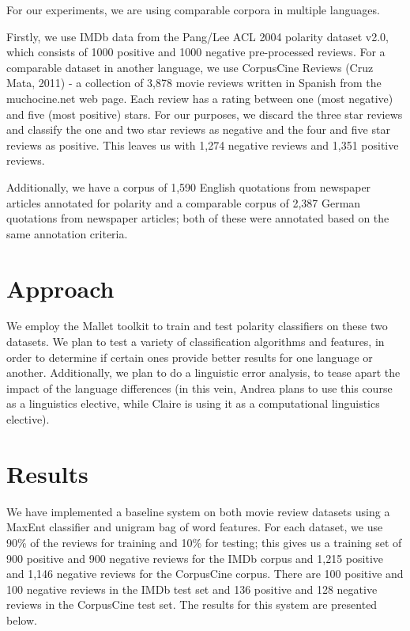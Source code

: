 \documentclass[11pt]{article}
\begin{document}
For our experiments, we are using comparable corpora in multiple languages.

Firstly, we use IMDb data from the Pang/Lee ACL 2004 polarity dataset v2.0, which consists of 1000 positive and 1000 negative pre-processed reviews.  For a comparable dataset in another language, we use CorpusCine Reviews (Cruz Mata, 2011) - a collection of 3,878 movie reviews written in Spanish from the muchocine.net web page.  Each review has a rating between one (most negative) and five (most positive) stars.  For our purposes, we discard the three star reviews and classify the one and two star reviews as negative and the four and five star reviews as positive.  This leaves us with 1,274 negative reviews and 1,351 positive reviews.

Additionally, we have a corpus of 1,590 English quotations from newspaper articles annotated for polarity and a comparable corpus of 2,387 German quotations from newspaper articles; both of these were annotated based on the same annotation criteria.

\section{Approach}

We employ the Mallet toolkit to train and test polarity classifiers on these two datasets.  We plan to test a variety of classification algorithms and features, in order to determine if certain ones provide better results for one language or another.  Additionally, we plan to do a linguistic error analysis, to tease apart the impact of the language differences (in this vein, Andrea plans to use this course as a linguistics elective, while Claire is using it as a computational linguistics elective).

\section{Results}

We have implemented a baseline system on both movie review datasets using a MaxEnt classifier and unigram bag of word features.  For each dataset, we use 90\% of the reviews for training and 10\% for testing; this gives us a training set of 900 positive and 900 negative reviews for the IMDb corpus and 1,215 positive and 1,146 negative reviews for the CorpusCine corpus.  There are 100 positive and 100 negative reviews in the IMDb test set and 136 positive and 128 negative reviews in the CorpusCine test set.  The results for this system are presented below.
\end{document}
